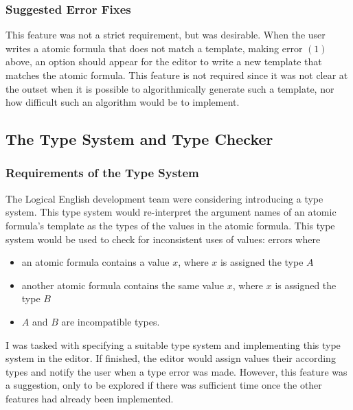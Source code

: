 \documentclass[../main.tex]{subfiles}
\begin{document}
\subsubsection{Suggested Error Fixes}
This feature was not a strict requirement, but was desirable. When the user writes a atomic formula that does not match a template, making error $(1)$ above, an option should appear for the editor to write a new template that matches the atomic formula. This feature is not required since it was not clear at the outset when it is possible to algorithmically generate such a template, nor how difficult such an algorithm would be to implement.

\subsection{The Type System and Type Checker}
\subsubsection{Requirements of the Type System}
The Logical English development team were considering introducing a type system. This type system would re-interpret the argument names of an atomic formula's template as the types of the values in the atomic formula. This type system would be used to check for inconsistent uses of values: errors where
\begin{itemize}
    \item an atomic formula contains a value $x$, where $x$ is assigned the type $A$
    \item another atomic formula contains the same value $x$, where $x$ is assigned the type $B$
    \item $A$ and $B$ are incompatible types.
\end{itemize}
I was tasked with specifying a suitable type system and implementing this type system in the editor. If finished, the editor would assign values their according types and notify the user when a type error was made. However, this feature was a suggestion, only to be explored if there was sufficient time once the other features had already been implemented. 
\end{document}
